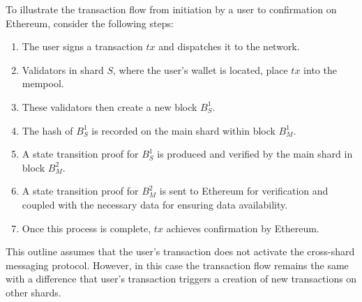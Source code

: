 To illustrate the transaction flow from initiation 
 by a user to confirmation on Ethereum, consider the following steps:
\begin{enumerate}
    \item The user signs a transaction $tx$ and dispatches it to the network.
    \item Validators in shard $S$, where the user's wallet is located,
        place $tx$ into the mempool.
    \item These validators then create a new block $B_{S}^{1}$.
    \item The hash of $B_{S}^{1}$ is recorded on the main shard within block $B_{M}^{1}$.
    \item A state transition proof for $B_{S}^{1}$ is 
        produced and verified by the main shard in block $B_{M}^{2}$.
    \item A state transition proof for $B_{M}^{2}$
        is sent to Ethereum for verification 
        and coupled with the necessary data for ensuring data availability.
    \item Once this process is complete, 
        $tx$ achieves confirmation by Ethereum.
\end{enumerate}

This outline assumes that the user's transaction does not
 activate the cross-shard messaging protocol.
However, in this case the transaction flow remains the same with a 
 difference that user's transaction triggers a creation of new 
 transactions on other shards. 
